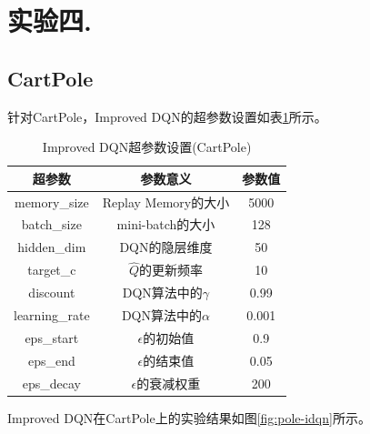 \documentclass[a4paper,UTF8]{article}
\theoremstyle{definition}
\begin{document}
\section*{实验四.}

\subsection*{CartPole}

针对CartPole，Improved DQN的超参数设置如表\ref{tab:pole-idqn}所示。

\begin{table}[H]
	\centering
	\begin{tabular}{ccc}
		\toprule
		超参数 & 参数意义 & 参数值 \\
		\midrule
		memory\_size & Replay Memory的大小 & 5000 \\
		batch\_size & mini-batch的大小 & 128 \\
		hidden\_dim & DQN的隐层维度 & 50 \\
		target\_c & $\hat{Q}$的更新频率 & 10 \\
		discount & DQN算法中的$\gamma$ & 0.99 \\
		learning\_rate & DQN算法中的$\alpha$ & 0.001 \\
		eps\_start & $\epsilon$的初始值 & 0.9 \\
		eps\_end & $\epsilon$的结束值 & 0.05 \\
		eps\_decay & $\epsilon$的衰减权重 & 200 \\
		\bottomrule
	\end{tabular}
	\caption{Improved DQN超参数设置(CartPole)}\label{tab:pole-idqn}
\end{table}

Improved DQN在CartPole上的实验结果如图\ref{fig:pole-idqn}所示。
\end{document}
